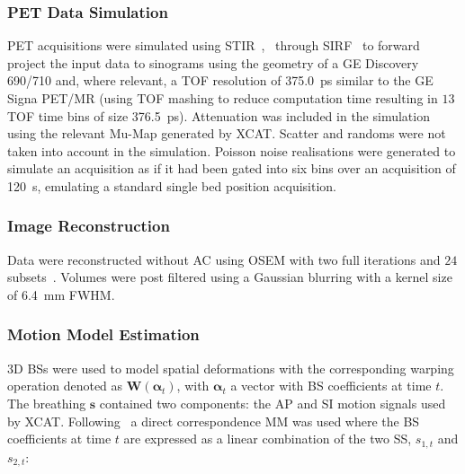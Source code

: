             \subsubsection{PET Data Simulation} \label{sec:impact_of_tof_on_respiratory_motion_model_estimation_using_pre_gated_no_intra_cycle_motion_nac_pet_methods_pet_data_simulation}
                \gls{PET} acquisitions were simulated using \gls{STIR}~,~ through \gls{SIRF}~ to forward project the input data to sinograms using the geometry of a \gls{GE} Discovery 690/710 and, where relevant, a \gls{TOF} resolution of \SI{375.0}{\pico\second} similar to the \gls{GE} Signa \gls{PET}/\gls{MR} (using \gls{TOF} mashing to reduce computation time resulting in $13$ \gls{TOF} time bins of size \SI{376.5}{\pico\second}). Attenuation was included in the simulation using the relevant \gls{Mu-Map} generated by \gls{XCAT}. Scatter and randoms were not taken into account in the simulation. Poisson noise realisations were generated to simulate an acquisition as if it had been gated into six bins over an acquisition of \SI{120}{\second}, emulating a standard single bed position acquisition. 
            
            \subsubsection{Image Reconstruction} \label{sec:impact_of_tof_on_respiratory_motion_model_estimation_using_pre_gated_no_intra_cycle_motion_nac_pet_methods_image_reconstruction}
                Data were reconstructed without \gls{AC} using \gls{OSEM} with two full iterations and $24$ subsets~. Volumes were post filtered using a Gaussian blurring with a kernel size of \SI{6.4}{\milli\metre} \gls{FWHM}.
            
            \subsubsection{Motion Model Estimation} \label{sec:impact_of_tof_on_respiratory_motion_model_estimation_using_pre_gated_no_intra_cycle_motion_nac_pet_methods_motion_model_estimation}
                \gls{3D} \gls{BS}s were used to model spatial deformations with the corresponding warping operation denoted as $\mathbf{W}(\mathbf{\alpha}_t)$, with $\mathbf{\alpha}_t$ a vector with \gls{BS} coefficients at time $t$. The breathing  $\mathbf{s}$ contained two components: the \gls{AP} and \gls{SI} motion signals used by \gls{XCAT}. Following~ a direct correspondence \gls{MM} was used where the \gls{BS} coefficients at time $t$ are expressed as a linear combination of the two \gls{SS}, $s_{1,t}$ and $s_{2,t}$:
            
